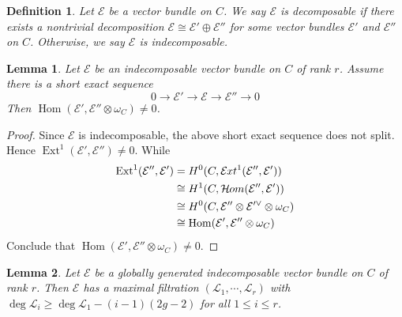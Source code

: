 \documentclass{ctexart}
\newtheorem{definition}{Definition}[section]
\newtheorem{lemma}{Lemma}[section]
\renewcommand{\hom}{\operatorname{Hom}}
\newcommand{\ext}{\operatorname{Ext}}
\newcommand{\sheafhom}{\mathcal{H}\kern -.5pt om}
\newcommand{\sheafext}{\mathcal{E}\kern -.5pt xt}
\begin{document}
\begin{definition}
    Let $\mathcal{E}$ be a vector bundle on $C$.
    We say $\mathcal{E}$ is decomposable if there exists a nontrivial decomposition $\mathcal{E} \cong \mathcal{E}' \oplus \mathcal{E}''$ for some vector bundles $\mathcal{E}'$ and $\mathcal{E}''$ on $C$.
    Otherwise, we say $\mathcal{E}$ is indecomposable.
\end{definition}
\begin{lemma}
    Let $\mathcal{E}$ be an indecomposable vector bundle on $C$ of rank $r$.
    Assume there is a short exact sequence
    \begin{equation}
        0 \longrightarrow \mathcal{E}' \longrightarrow \mathcal{E} \longrightarrow \mathcal{E}'' \longrightarrow 0
    \end{equation}
    Then $\hom(\mathcal{E}', \mathcal{E}'' \otimes \omega_{C}) \neq 0$.
    \label{Lemma 5.5}
\end{lemma}
\begin{proof}
    Since $\mathcal{E}$ is indecomposable, the above short exact sequence does not split.
    Hence $\ext^{1}(\mathcal{E}', \mathcal{E}'') \neq 0$.
    While 
    \begin{equation}
        \begin{split}
            \ext^1(\mathcal{E}'', \mathcal{E}') & = H^{0}(C, \sheafext^{1}(\mathcal{E}'', \mathcal{E}')) \\
            & \cong H^{1}(C, \sheafhom(\mathcal{E}'', \mathcal{E}')) \\
            & \cong H^{0}(C, \mathcal{E}'' \otimes \mathcal{E}'^{\vee} \otimes \omega_{C}) \\
            & \cong \hom(\mathcal{E}', \mathcal{E}'' \otimes \omega_{C})
        \end{split}
    \end{equation}
    Conclude that $\hom(\mathcal{E}', \mathcal{E}'' \otimes \omega_{C}) \neq 0$.
\end{proof}
\begin{lemma}
    Let $\mathcal{E}$ be a globally generated indecomposable vector bundle on $C$ of rank $r$.
    Then $\mathcal{E}$ has a maximal filtration $(\mathcal{L}_{1}, \cdots, \mathcal{L}_{r})$ with $\deg \mathcal{L}_{i} \ge \deg \mathcal{L}_{1} - (i - 1)(2g - 2)$ for all $1 \le i \le r$.
    \label{Lemma 5.6}
\end{lemma}
\end{document}
